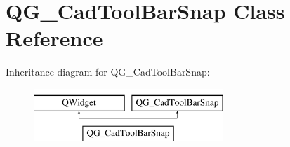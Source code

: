 \hypertarget{classQG__CadToolBarSnap}{\section{Q\-G\-\_\-\-Cad\-Tool\-Bar\-Snap Class Reference}
\label{classQG__CadToolBarSnap}
}
Inheritance diagram for Q\-G\-\_\-\-Cad\-Tool\-Bar\-Snap\-:\begin{figure}[H]
\begin{center}
\leavevmode
\includegraphics[height=2.000000cm]{classQG__CadToolBarSnap}
\end{center}
\end{figure}
